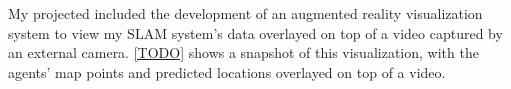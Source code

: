 My projected included the development of an augmented reality visualization system to view my SLAM system's data overlayed on top of a video captured by an external camera. \autoref{TODO} shows a snapshot of this visualization, with the agents' map points and predicted locations overlayed on top of a video.